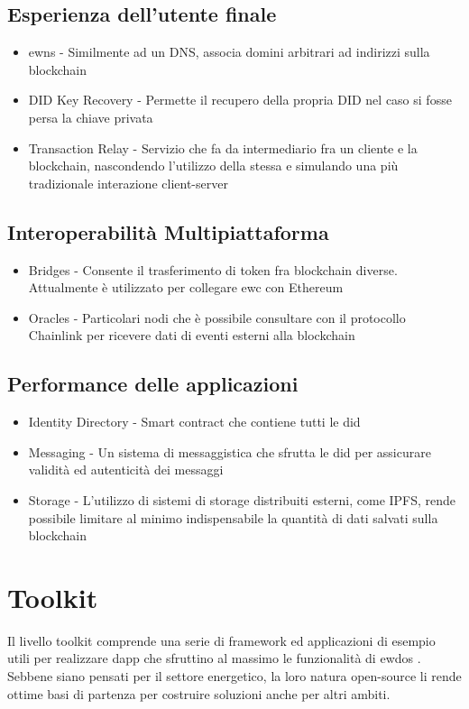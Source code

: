 \subsection{Esperienza dell'utente finale}
\begin{itemize}
    \item \gls{ewns} - Similmente ad un DNS, associa domini arbitrari ad indirizzi sulla blockchain
    \item DID Key Recovery - Permette il recupero della propria DID nel caso si fosse persa la chiave privata
    \item Transaction Relay - Servizio che fa da intermediario fra un cliente e la blockchain, nascondendo l'utilizzo della stessa e simulando una più tradizionale interazione client-server
\end{itemize}

\subsection{Interoperabilità Multipiattaforma}
\begin{itemize}
    \item Bridges - Consente il trasferimento di token fra blockchain diverse. Attualmente è utilizzato per collegare \gls{ewc} con Ethereum
    \item Oracles - Particolari nodi che è possibile consultare con il protocollo Chainlink per ricevere dati di eventi esterni alla blockchain
\end{itemize}

\subsection{Performance delle applicazioni}
\begin{itemize}
    \item Identity Directory - Smart contract che contiene tutti le \gls{did}
    \item Messaging - Un sistema di messaggistica che sfrutta le \gls{did} per assicurare validità ed autenticità dei messaggi
    \item Storage - L'utilizzo di sistemi di storage distribuiti esterni, come IPFS, rende possibile limitare al minimo indispensabile la quantità di dati salvati sulla blockchain
\end{itemize}

\section{Toolkit}
Il livello toolkit comprende una serie di framework ed applicazioni di esempio utili per realizzare \gls{dapp} che sfruttino al massimo le funzionalità di \gls{ewdos} \cite{art:ew-dos}. \\
Sebbene siano pensati per il settore energetico, la loro natura open-source li rende ottime basi di partenza per costruire soluzioni anche per altri ambiti. \\

